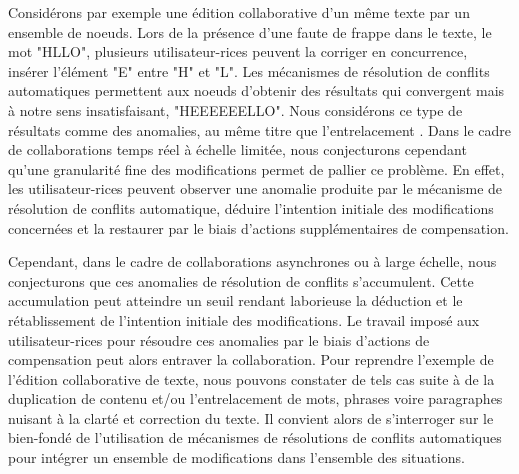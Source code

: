 Considérons par exemple une édition collaborative d'un même texte par un ensemble de noeuds.
Lors de la présence d'une faute de frappe dans le texte, \eg le mot "HLLO", plusieurs utilisateur-rices peuvent la corriger en concurrence, \ie insérer l'élément "E" entre "H" et "L".
Les mécanismes de résolution de conflits automatiques permettent aux noeuds d'obtenir des résultats qui convergent mais à notre sens insatisfaisant, \eg "HEEEEEELLO".
Nous considérons ce type de résultats comme des anomalies, au même titre que l'entrelacement \cite{2019-interleaving-anomalies-collaborative-editors-kleppmann}.
Dans le cadre de collaborations temps réel à échelle limitée, nous conjecturons cependant qu'une granularité fine des modifications permet de pallier ce problème.
En effet, les utilisateur-rices peuvent observer une anomalie produite par le mécanisme de résolution de conflits automatique, déduire l'intention initiale des modifications concernées et la restaurer par le biais d'actions supplémentaires de compensation.

Cependant, dans le cadre de collaborations asynchrones ou à large échelle, nous conjecturons que ces anomalies de résolution de conflits s'accumulent.
Cette accumulation peut atteindre un seuil rendant laborieuse la déduction et le rétablissement de l'intention initiale des modifications.
Le travail imposé aux utilisateur-rices pour résoudre ces anomalies par le biais d'actions de compensation peut alors entraver la collaboration.
Pour reprendre l'exemple de l'édition collaborative de texte, nous pouvons constater de tels cas suite à de la duplication de contenu et/ou l'entrelacement de mots, phrases voire paragraphes nuisant à la clarté et correction du texte.
Il convient alors de s'interroger sur le bien-fondé de l'utilisation de mécanismes de résolutions de conflits automatiques pour intégrer un ensemble de modifications dans l'ensemble des situations.\\

